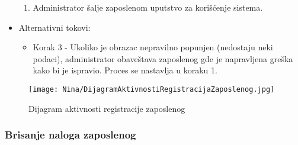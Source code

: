 \documentclass[a4paper]{article}
\begin{document}
\begin{itemize}
\begin{enumerate}
            \item Administrator šalje zaposlenom uputstvo za korišćenje sistema.
        \end{enumerate}
    \item Alternativni tokovi:
        \begin{itemize}
            \item Korak 3 - Ukoliko je obrazac nepravilno popunjen (nedostaju neki podaci), administrator obaveštava zaposlenog gde je napravljena greška kako bi je ispravio. Proces se nastavlja u koraku 1.
        \end{itemize}
\end{itemize}

\begin{figure}[H]
    \centering
    \texttt{[image: Nina/DijagramAktivnostiRegistracijaZaposlenog.jpg]}
    \caption{Dijagram aktivnosti registracije zaposlenog}
    \label{fig:RegistracijaZ}
\end{figure}


\subsubsection{Brisanje naloga zaposlenog}
\end{document}
